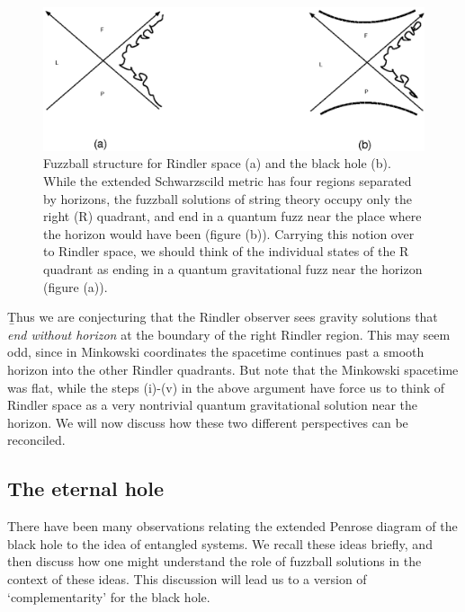 \documentclass[11pt]{article}
\begin{document}
\begin{figure}[htbp]
\begin{center}
\includegraphics[scale=.75]{fn11.eps}
\caption{{Fuzzball structure for Rindler space (a) and the black hole (b). While the extended Schwarzscild metric has four regions separated by horizons, the fuzzball solutions of string theory occupy only the right (R) quadrant, and end in a quantum fuzz near the place where the horizon would have been (figure (b)). Carrying this notion over to Rindler space, we should think of the individual states of the R quadrant as ending in a quantum gravitational fuzz near the horizon (figure (a)).}}
\label{fn11}
\end{center}
\end{figure}


\b

Thus we are conjecturing that the Rindler observer sees gravity solutions that {\it end without horizon} at the boundary of the 
right Rindler region. This may seem odd, since in Minkowski coordinates the spacetime continues past a smooth horizon into the other Rindler quadrants. But note that the Minkowski spacetime was flat, while the steps (i)-(v) in the above argument have force us to think of Rindler space as a very nontrivial quantum gravitational solution near the horizon. We will now discuss how these two different perspectives can be reconciled.

\subsection{The eternal hole}


There have been many observations relating the extended Penrose diagram of the black hole to the idea of entangled systems. We recall these ideas briefly, and then discuss how one might understand the role of fuzzball solutions in the context of these ideas. This discussion will lead us to a version of `complementarity' for the black hole.
\end{document}
